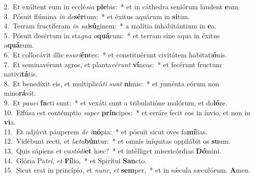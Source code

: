{2.~}Et exáltent eum in ecclé\textit{si}\textit{a} \textbf{ple}bis:~* et in cáthedra seniórum laudent \textbf{e}um.\\
{3.~}Pósuit flúmina \textit{in} \textit{de}\textbf{sér}tum:~* et éxitus aquárum in \textbf{si}tim.\\
{4.~}Terram fructíferam \textit{in} \textit{sal}\textbf{sú}ginem:~* a malítia inhabitántium in \textbf{e}a.\\
{5.~}Pósuit desértum in sta\textit{gna} \textit{a}\textbf{quá}rum:~* et terram sine aqua in éxitus a\textbf{quá}rum.\\
{6.~}Et collocávit illic e\textit{su}\textit{ri}\textbf{én}tes:~* et constituérunt civitátem habitati\textbf{ó}nis.\\
{7.~}Et seminavérunt agros, et planta\textit{vé}\textit{runt} \textbf{ví}neas:~* et fecérunt fructum nativi\textbf{tá}tis.\\
{8.~}Et benedíxit eis, et multiplicá\textit{ti} \textit{sunt} \textbf{ni}mis:~* et juménta eórum non mino\textbf{rá}vit.\\
{9.~}Et \textit{pau}\textit{ci} \textbf{fa}cti sunt:~* et vexáti sunt a tribulatióne malórum, et do\textbf{ló}re.\\
{10.~}Effúsa est contémptio \textit{su}\textit{per} \textbf{prín}cipes:~* et erráre fecit eos in ínvio, et non in \textbf{vi}a.\\
{11.~}Et adjúvit páuperem \textit{de} \textit{i}\textbf{nó}pia:~* et pósuit sicut oves fa\textbf{mí}lias.\\
{12.~}Vidébunt recti, et \textit{læ}\textit{ta}\textbf{bún}tur:~* et omnis iníquitas oppilábit os \textbf{su}um.\\
{13.~}Quis sápiens et cu\textit{stó}\textit{di}\textbf{et} hæc?~* et intélliget misericórdias \textbf{Dó}mini.\\
{14.~}Glória Pa\textit{tri}, \textit{et} \textbf{Fí}lio,~* et Spirítui \textbf{San}cto.\\
{15.~}Sicut erat in princípio, et \textit{nunc}, \textit{et} \textbf{sem}per,~* et in sǽcula sæculórum. \textbf{A}men.\\
